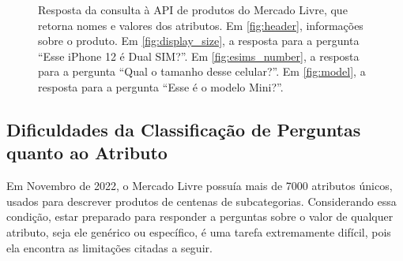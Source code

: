 \begin{figure}
    \caption{Resposta da consulta à API de produtos do Mercado Livre, que retorna nomes e valores dos atributos.
    Em \ref{fig:header}, informações sobre o produto.
    Em \ref{fig:display_size}, a resposta para a pergunta ``Esse iPhone 12 é Dual SIM?''.
    Em \ref{fig:esims_number}, a resposta para a pergunta ``Qual o tamanho desse celular?''.
    Em \ref{fig:model}, a resposta para a pergunta ``Esse é o modelo Mini?''.}
    \label{fig:resposta_api}
\end{figure}


\subsection{Dificuldades da Classificação de Perguntas quanto ao Atributo}
\label{dificuldades da classificação de perguntas quanto ao atributo}
Em Novembro de 2022, o Mercado Livre possuía mais de 7000 atributos únicos, usados para descrever produtos de centenas de subcategorias. Considerando essa condição, estar preparado para responder a perguntas sobre o valor de qualquer atributo, seja ele genérico ou específico, é uma tarefa extremamente difícil, pois ela encontra as limitações citadas a seguir.

